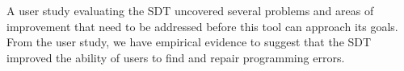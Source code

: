 \documentclass[11pt, letterpaper, onecolumn]{article}
\begin{document}
A user study  evaluating the SDT uncovered several  problems and areas
of improvement that need to be addressed before this tool can approach
its goals. From the user  study, we have empirical evidence to suggest
that  the  SDT  improved the  ability  of  users  to find  and  repair
programming errors.


%
%
\end{document}
